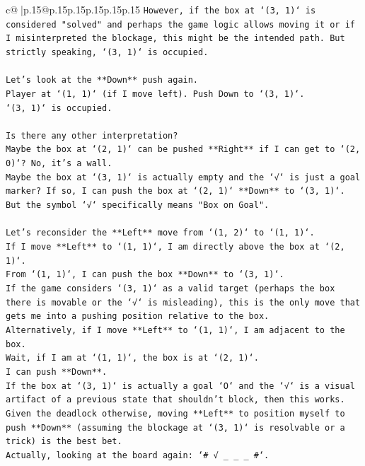 \documentclass{article}
\begin{document}
{\begin{supertabular}{c@{$\;$}|p{.15\linewidth}@{}p{.15\linewidth}p{.15\linewidth}p{.15\linewidth}p{.15\linewidth}p{.15\linewidth}}
{{{\texttt{However, if the box at `(3, 1)` is considered "solved" and perhaps the game logic allows moving it or if I misinterpreted the blockage, this might be the intended path. But strictly speaking, `(3, 1)` is occupied.} \\
\\ 
\texttt{Let's look at the **Down** push again.} \\
\texttt{Player at `(1, 1)` (if I move left). Push Down to `(3, 1)`.} \\
\texttt{`(3, 1)` is occupied.} \\
\\ 
\texttt{Is there any other interpretation?} \\
\texttt{Maybe the box at `(2, 1)` can be pushed **Right** if I can get to `(2, 0)`? No, it's a wall.} \\
\texttt{Maybe the box at `(3, 1)` is actually empty and the `√` is just a goal marker? If so, I can push the box at `(2, 1)` **Down** to `(3, 1)`.} \\
\texttt{But the symbol `√` specifically means "Box on Goal".} \\
\\ 
\texttt{Let's reconsider the **Left** move from `(1, 2)` to `(1, 1)`.} \\
\texttt{If I move **Left** to `(1, 1)`, I am directly above the box at `(2, 1)`.} \\
\texttt{From `(1, 1)`, I can push the box **Down** to `(3, 1)`.} \\
\texttt{If the game considers `(3, 1)` as a valid target (perhaps the box there is movable or the `√` is misleading), this is the only move that gets me into a pushing position relative to the box.} \\
\texttt{Alternatively, if I move **Left** to `(1, 1)`, I am adjacent to the box.} \\
\texttt{Wait, if I am at `(1, 1)`, the box is at `(2, 1)`.} \\
\texttt{I can push **Down**.} \\
\texttt{If the box at `(3, 1)` is actually a goal `O` and the `√` is a visual artifact of a previous state that shouldn't block, then this works.} \\
\texttt{Given the deadlock otherwise, moving **Left** to position myself to push **Down** (assuming the blockage at `(3, 1)` is resolvable or a trick) is the best bet.} \\
\texttt{Actually, looking at the board again: `\# √ \_ \_ \_ \#`.} \\
}}}
\end{supertabular}}
\end{document}
